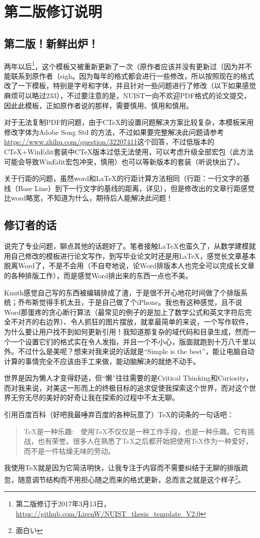 \section{第二版修订说明}
\subsection{第二版！新鲜出炉！}
两年以后\footnote{第二版修订于2017年3月13日，\url{https://github.com/LirenW/NUIST_thesis_template_V2.0}}，这个模板又被重新更新了一次（原作者应该并没有更新过（因为并不能联系到原作者（sigh。因为每年的格式都会进行一些修改，所以按照现在的格式改了一下模板，特别是字号和字体，并且针对一些问题进行了修改（以下如果感觉麻烦可以略过233），不过要注意的是，NUIST一向不欢迎PDF格式的论文提交，因此此模板，正如原作者说的那样，需要慎用、慎用和慎用。\par
对于无法复制PDF的问题，由于CTeX的设置问题解决方案比较复杂，本模板采用修改字体为Adobe Song Std 的方法，不过如果要完整解决此问题请参考\url{https://www.zhihu.com/question/32207411}这个回答，不过低版本的CTeX+WinEdit套装中CTeX版本过低无法使用，可以考虑升级全部宏包（此方法可能会导致WinEdit宏包冲突，慎用）也可以等新版本的套装（听说快出了）。\par
关于行距的问题，虽然word和LaTeX的行距计算方法相同（行距：一行文字的基线（Base Line）到下一行文字的基线的距离，详见\cite{x4}），但是修改出的文章行距感觉比word略宽，不知道为什么，期待后人能解决此问题！\par
\subsection{修订者的话}
说完了专业问题，聊点其他的话题好了。笔者接触LaTeX也蛮久了，从数学建模就用自己修改的模板进行论文写作，到写毕业论文时还是用LaTeX，感觉长文章基本脱离Word了，不是不会用（不自夸地说，论Word排版本人也完全可以完成长文章的各种排版工作），而是感觉Word排出来的东西一点也不美。\par
Knuth感觉自己写的东西被编辑排成了渣，于是很不开心地花时间做了个排版系统；乔布斯觉得手机太丑，于是自己做了个iPhone。我也有这种感觉，且不说Word那蛋疼的贪心断行算法（最常见的例子的是加上了数学公式和英文字符后完全不对齐的右边界）、令人抓狂的图片摆放，就拿最简单的来说，一个写作软件，为什么要让用户找不到如何更新引用！我知道那复杂的域代码和目录生成，然而一个一个设置它们的格式实在令人发指，并且一个不小心，版面就跑到十万八千里以外。不过什么是美呢？想来对我来说的话就是“Simple is the best”，能让电脑自动计算的事情完全不应该由手工来做，能动脑解决的就绝不动手。\par
世界是因为懒人才变得舒适，但“懒”往往需要的是Critical Thinking和Curiosity，而对我来说，对美这一形而上的终极目标的追求促使我探索这个世界，而对这个世界无穷无尽的美好的好奇让我在探索的过程中不太无聊。\par
引用百度百科（好吧我最唾弃百度的各种玩意了）TeX的词条的一句话吧：
\begin{quote}
  TeX是一种乐趣:　使用TeX不仅仅是一种工作手段，也是一种乐趣。它有挑战，也有荣誉。很多人在熟悉了TeX之后都开始把使用TeX作为一种爱好，而不是一件枯燥无味的劳动。
\end{quote}
我使用TeX就是因为它简洁明快，让我专注于内容而不需要纠结于无聊的排版疏忽，随意调节结构而不用担心随之而来的格式更新，总而言之就是这个样子\footnote{面白い}。\par